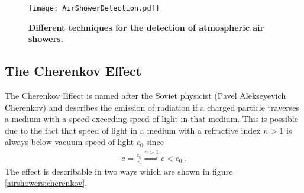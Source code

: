 \begin{figure}[h]
	\texttt{[image: AirShowerDetection.pdf]}
	\caption[Different techniques for air shower detection]{\textbf{Different techniques for the detection of atmospheric air showers. \cite{airshowers:schroeder}} }	
\end{figure}

\subsection{The Cherenkov Effect}

The Cherenkov Effect is named after the Soviet physicist \textsc(Pavel Alekseyevich Cherenkov) and describes the emission of radiation if a charged particle traverses a medium with a speed exceeding speed of light in that medium. \cite{airshowers:cherenkov} This is possible due to the fact that speed of light in a medium with a refractive index $n > 1$ is always below vacuum speed of light $c_0$ since
\begin{align}
	c = \frac{c_0}{n} \overset{n>1}{\Rightarrow} c < c_0\,.
\end{align} 
The effect is describable in two ways which are shown in figure \ref{airshowers:cherenkov}.
